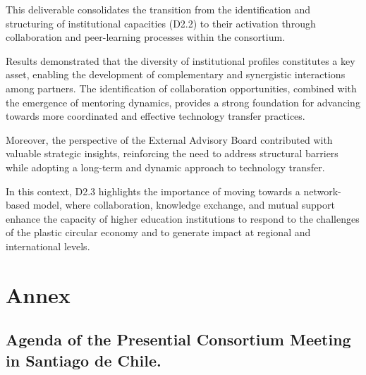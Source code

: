 \documentclass[
  12pt,
  oneside]{book}
\begin{document}
This deliverable consolidates the transition from the identification and
structuring of institutional capacities (D2.2) to their activation
through collaboration and peer-learning processes within the consortium.

Results demonstrated that the diversity of institutional profiles
constitutes a key asset, enabling the development of complementary and
synergistic interactions among partners. The identification of
collaboration opportunities, combined with the emergence of mentoring
dynamics, provides a strong foundation for advancing towards more
coordinated and effective technology transfer practices.

Moreover, the perspective of the External Advisory Board contributed
with valuable strategic insights, reinforcing the need to address
structural barriers while adopting a long-term and dynamic approach to
technology transfer.

In this context, D2.3 highlights the importance of moving towards a
network-based model, where collaboration, knowledge exchange, and mutual
support enhance the capacity of higher education institutions to respond
to the challenges of the plastic circular economy and to generate impact
at regional and international levels.

\chapter{Annex}\label{annex}

\section{Agenda of the Presential Consortium Meeting in Santiago de
Chile.}\label{sec-planning}






\backmatter
\end{document}
